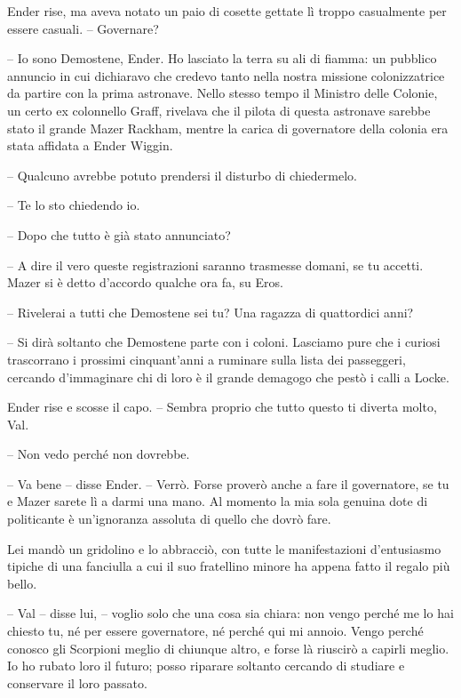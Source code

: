 {Ender rise, ma aveva notato un paio di cosette gettate lì troppo
	casualmente per essere casuali. -- Governare?}

{-- Io sono Demostene, Ender. Ho lasciato la terra su ali di fiamma: un
	pubblico annuncio in cui dichiaravo che credevo tanto nella nostra
	missione colonizzatrice da partire con la prima astronave. Nello stesso
	tempo il Ministro delle Colonie, un certo ex colonnello Graff, rivelava
	che il pilota di questa astronave sarebbe stato il grande Mazer Rackham,
	mentre la carica di governatore della colonia era stata affidata a Ender
	Wiggin.}

{-- Qualcuno avrebbe potuto prendersi il disturbo di chiedermelo.}

{-- Te lo sto chiedendo io.}

{-- Dopo che tutto è già stato annunciato?}

{-- A dire il vero queste registrazioni saranno trasmesse domani, se tu
	accetti. Mazer si è detto d'accordo qualche ora fa, su Eros.}

{-- Rivelerai a tutti che Demostene sei tu? Una ragazza di quattordici
	anni?}

{-- Si dirà soltanto che Demostene parte con i coloni. Lasciamo pure che
	i curiosi trascorrano i prossimi cinquant'anni a ruminare sulla lista
	dei passeggeri, cercando d'immaginare chi di loro è il grande demagogo
	che pestò i calli a Locke.}

{Ender rise e scosse il capo. -- Sembra proprio che tutto questo ti
	diverta molto, Val.}

{-- Non vedo perché non dovrebbe.}

{-- Va bene -- disse Ender. -- Verrò. Forse proverò anche a fare il
	governatore, se tu e Mazer sarete lì a darmi una mano. Al momento la mia
	sola genuina dote di politicante è un'ignoranza assoluta di quello che
	dovrò fare.}

{Lei mandò un gridolino e lo abbracciò, con tutte le manifestazioni
	d'entusiasmo tipiche di una fanciulla a cui il suo fratellino minore ha
	appena fatto il regalo più bello.}

{-- Val -- disse lui, -- voglio solo che una cosa sia chiara: non vengo
	perché me lo hai chiesto tu, né per essere governatore, né perché qui mi
	annoio. Vengo perché conosco gli Scorpioni meglio di chiunque altro, e
	forse là riuscirò a capirli meglio. Io ho rubato loro il futuro; posso
	riparare soltanto cercando di studiare e conservare il loro passato.}

{~}

